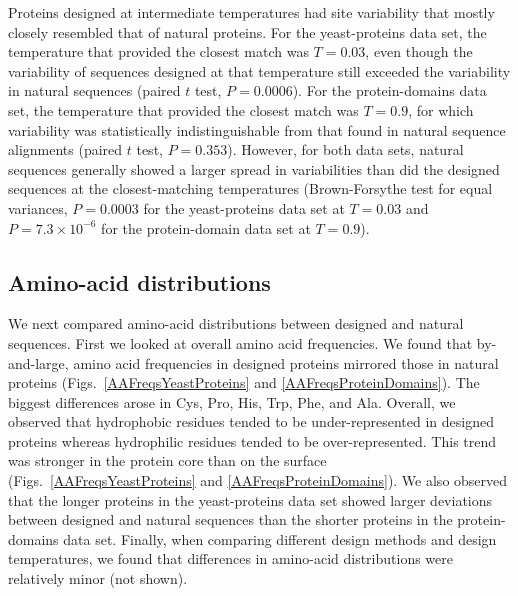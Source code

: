 \documentclass[12pt]{article}
\begin{document}
Proteins designed at intermediate temperatures had site variability that mostly closely resembled that of natural proteins. For the yeast-proteins data set, the temperature that provided the closest match was $T=0.03$, even though the variability of sequences designed at that temperature still exceeded the variability in natural sequences (paired $t$ test, $P= 0.0006$). For the protein-domains data set, the temperature that provided the closest match was $T=0.9$, for which variability was statistically indistinguishable from that found in natural sequence alignments (paired $t$ test, $P= 0.353$). However, for both data sets, natural sequences generally showed a larger spread in variabilities than did the designed sequences at the closest-matching temperatures (Brown-Forsythe test for equal variances, $P= 0.0003$ for the yeast-proteins data set at $T = 0.03$  and $P= 7.3\times 10^{-6}$ for the protein-domain data set at $T = 0.9$).

\subsection{Amino-acid distributions}
\label{AminoAcidDistributions}

We next compared amino-acid distributions between designed and natural sequences. First we looked at overall amino acid frequencies. We found that by-and-large, amino acid frequencies in designed proteins mirrored those in natural proteins (Figs.~\ref{AAFreqsYeastProteins} and \ref{AAFreqsProteinDomains}). The biggest differences arose in Cys, Pro, His, Trp, Phe, and Ala. Overall, we observed that hydrophobic residues tended to be under-represented in designed proteins whereas hydrophilic residues tended to be over-represented. This trend was stronger in the protein core than on the surface (Figs.~\ref{AAFreqsYeastProteins} and \ref{AAFreqsProteinDomains}). We also observed that the longer proteins in the yeast-proteins data set showed larger deviations between designed and natural sequences than the shorter proteins in the protein-domains data set. Finally, when comparing different design methods and design temperatures, we found that differences in amino-acid distributions were relatively minor (not shown).
\end{document}
